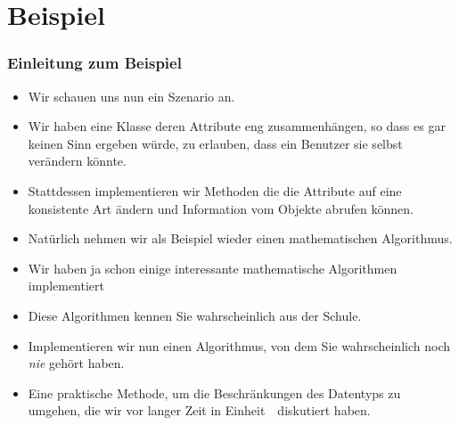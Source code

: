 \documentclass[aspectratio=169,mathserif,notheorems]{beamer}%
\begin{document}
\section{Beispiel}%
%
\begin{frame}[t]%
\frametitle{Einleitung zum Beispiel}%
\begin{itemize}%
%
\item Wir schauen uns nun ein Szenario an.%
%
\item<2-> Wir haben eine Klasse deren Attribute eng zusammenhängen, so dass es gar keinen Sinn ergeben würde, zu erlauben, dass ein Benutzer sie selbst verändern könnte.%
%
\item<3-> Stattdessen implementieren wir Methoden die die Attribute auf eine konsistente Art ändern und Information vom Objekte abrufen können.%
%
\item<5-> Natürlich nehmen wir als Beispiel wieder einen mathematischen Algorithmus.%
%
\item<6-> Wir haben ja schon einige interessante mathematische Algorithmen implementiert%
%
\item<10-> Diese Algorithmen kennen Sie wahrscheinlich aus der Schule.%
%
\item<11-> Implementieren wir nun einen Algorithmus, von dem Sie wahrscheinlich noch \emph{nie} gehört haben.%
%
\item<12-> Eine praktische Methode, um die Beschränkungen des Datentyps  zu umgehen, die wir vor langer Zeit in Einheit~\unitFloat\ diskutiert haben.%
%
\end{itemize}%
\end{frame}%
%
\end{document}

